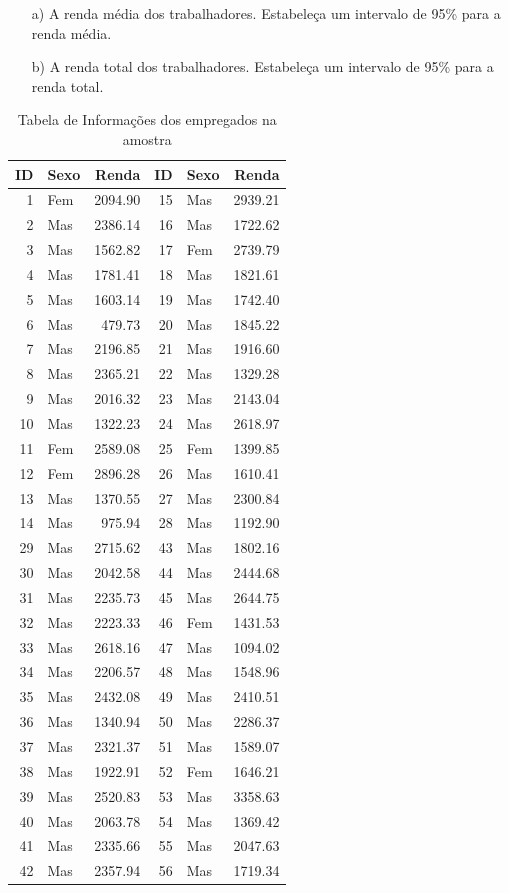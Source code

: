 \documentclass[a4paper,12pt,oneside,twocolumn]{Config/milktest}
\begin{document}
\begin{itemize}
    \item[a)] A renda média dos trabalhadores. Estabeleça um intervalo de 95\% para a renda média.
\item[b)] A renda total dos trabalhadores. Estabeleça um intervalo de 95\% para a renda total. 
\end{itemize}
{\small \begin{table}[!htp]
\centering
\begin{tabular}{rlr|rlr}
  \hline
ID & Sexo & Renda & ID & Sexo & Renda \\ 
  \hline
    1 & Fem & 2094.90 &   15 & Mas & 2939.21 \\
    2 & Mas & 2386.14 &   16 & Mas & 1722.62 \\
    3 & Mas & 1562.82 &   17 & Fem & 2739.79 \\
    4 & Mas & 1781.41 &   18 & Mas & 1821.61 \\
    5 & Mas & 1603.14 &   19 & Mas & 1742.40 \\
    6 & Mas &  479.73 &   20 & Mas & 1845.22 \\
    7 & Mas & 2196.85 &   21 & Mas & 1916.60 \\
    8 & Mas & 2365.21 &   22 & Mas & 1329.28 \\
    9 & Mas & 2016.32 &   23 & Mas & 2143.04 \\
   10 & Mas & 1322.23 &   24 & Mas & 2618.97 \\
   11 & Fem & 2589.08 &   25 & Fem & 1399.85 \\
   12 & Fem & 2896.28 &   26 & Mas & 1610.41 \\
   13 & Mas & 1370.55 &   27 & Mas & 2300.84 \\
   14 & Mas &  975.94 &   28 & Mas & 1192.90 \\ \hline   
   29 & Mas & 2715.62 &   43 & Mas & 1802.16 \\
   30 & Mas & 2042.58 &   44 & Mas & 2444.68 \\
   31 & Mas & 2235.73 &   45 & Mas & 2644.75 \\
   32 & Mas & 2223.33 &   46 & Fem & 1431.53 \\
   33 & Mas & 2618.16 &   47 & Mas & 1094.02 \\
   34 & Mas & 2206.57 &   48 & Mas & 1548.96 \\
   35 & Mas & 2432.08 &   49 & Mas & 2410.51 \\
   36 & Mas & 1340.94 &   50 & Mas & 2286.37 \\
   37 & Mas & 2321.37 &   51 & Mas & 1589.07 \\
   38 & Mas & 1922.91 &   52 & Fem & 1646.21 \\
   39 & Mas & 2520.83 &   53 & Mas & 3358.63 \\
   40 & Mas & 2063.78 &   54 & Mas & 1369.42 \\
   41 & Mas & 2335.66 &   55 & Mas & 2047.63 \\
   42 & Mas & 2357.94 &   56 & Mas & 1719.34 \\
   \hline
\end{tabular}
\caption{Tabela de Informações dos empregados na amostra} 
\label{ID:Renda}
\end{table}
}
\end{document}
